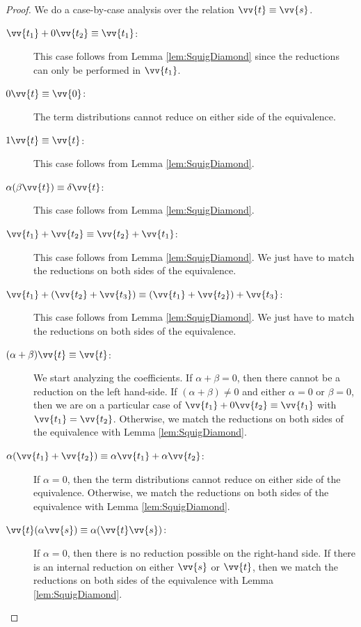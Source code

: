 \documentclass[runningheads,orivec,envcountsame,envcountsect]{llncs}
\begin{document}
\begin{proof}
  We do a case-by-case analysis over the relation $\vv{t}\equiv\vv{s}$.
  \begin{description}
    \item[$\vv{t_1} + 0\vv{t_2}\equiv\vv{t_1}$:] This case follows from Lemma \ref{lem:SquigDiamond} since the reductions can only be performed in $\vv{t_1}$.
    
    \item[$0\vv{t}\equiv\vv{0}$:] The term distributions cannot reduce on either side of the equivalence.
    
    \item[$1\vv{t}\equiv\vv{t}$:] This case follows from Lemma \ref{lem:SquigDiamond}.
    
    \item[$\alpha(\beta \vv{t})\equiv\delta\vv{t}$:] This case follows from Lemma \ref{lem:SquigDiamond}.
    
    \item[$\vv{t_1}+\vv{t_2}\equiv\vv{t_2}+\vv{t_1}$:] This case follows from Lemma \ref{lem:SquigDiamond}. We just have to match the reductions on both sides of the equivalence.
    
    \item[$\vv{t_1}+(\vv{t_2}+\vv{t_3})\equiv(\vv{t_1}+\vv{t_2})+\vv{t_3}$:] This case follows from Lemma \ref{lem:SquigDiamond}. We just have to match the reductions on both sides of the equivalence.
    
    \item[$(\alpha+\beta)\vv{t}\equiv\vv{t}$:] We start analyzing the coefficients. If $\alpha+\beta = 0$, then there cannot be a reduction on the left hand-side. If $(\alpha + \beta)\neq 0$ and either $\alpha=0$ or $\beta=0$, then we are on a particular case of $\vv{t_1} + 0\vv{t_2}\equiv\vv{t_1}$ with $\vv{t_1}=\vv{t_2}$. Otherwise, we match the reductions on both sides of the equivalence with Lemma \ref{lem:SquigDiamond}.
    
    \item[$\alpha(\vv{t_1}+\vv{t_2})\equiv\alpha\vv{t_1}+\alpha\vv{t_2}$:] If $\alpha=0$, then the term distributions cannot reduce on either side of the equivalence. Otherwise, we match the reductions on both sides of the equivalence with Lemma \ref{lem:SquigDiamond}.
    
    \item[$\vv{t} (\alpha\vv{s})\equiv\alpha(\vv{t}\vv{s})$:] If $\alpha=0$, then there is no reduction possible on the right-hand side. If there is an internal reduction on either $\vv{s}$ or $\vv{t}$, then we match the reductions on both sides of the equivalence with Lemma \ref{lem:SquigDiamond}.
    

\end{description}
\end{proof}
\end{document}
